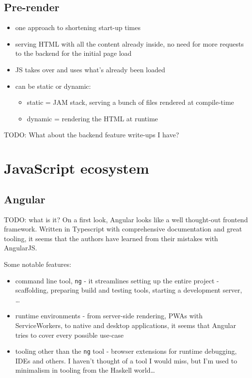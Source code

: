 \documentclass[english,odsaz]{fitthesis}
\begin{document}
\subsection{Pre-render}
\label{sec:org25dd468}
\begin{itemize}
\item one approach to shortening start-up times
\item serving HTML with all the content already inside, no need for more requests to
the backend for the initial page load
\item JS takes over and uses what's already been loaded
\item can be static or dynamic:
\begin{itemize}
\item static = JAM stack, serving a bunch of files rendered at compile-time
\item dynamic = rendering the HTML at runtime
\end{itemize}
\end{itemize}

TODO: What about the backend feature write-ups I have?

\section{JavaScript ecosystem}
\label{sec:org17dc5f4}
\subsection{Angular}
\label{sec:org7f55e9e}
TODO: what is it?
On a first look, Angular looks like a well thought-out frontend
framework. Written in Typescript with comprehensive documentation and great
tooling, it seems that the authors have learned from their mistakes with
AngularJS.

Some notable features:
\begin{itemize}
\item command line tool, \texttt{ng} - it streamlines setting up the entire project -
scaffolding, preparing build and testing tools, starting a
development server, \ldots{}
\item runtime environments - from server-side rendering, PWAs with ServiceWorkers,
to native and desktop applications, it seems that Angular tries to cover every
possible use-case
\item tooling other than the \texttt{ng} tool - browser extensions for runtime debugging,
IDEs and others. I haven't thought of a tool I would miss, but I'm used to
minimalism in tooling from the Haskell world\ldots{}
\end{itemize}
\end{document}

